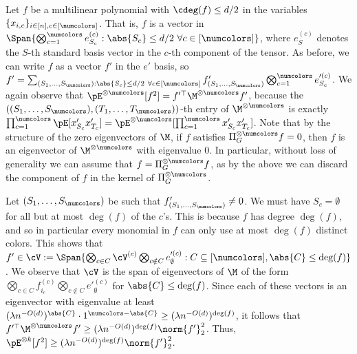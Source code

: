 Let $f$ be a multilinear polynomial with $\cdeg(f) \leq d/2$ in the variables $\{x_{i,c}\}_{i \in [n], c \in [\numcolors]}$. That is, $f$ is a vector in $\Span{ \bigotimes_{c =1}^{\numcolors} e^{(c)}_{S_c} : \abs{S_c} \leq d/2 \ \forall c \in [\numcolors]}$, where $e^{(c)}_S$ denotes the $S$-th standard basis vector in the $c$-th component of the tensor. As before, we can write $f$ as a vector $f'$ in the $e'$ basis, so $f' = \sum_{(S_1, \dots, S_\numcolors) : \abs{S_c} \leq d/2 \ \forall c \in [\numcolors]} f'_{(S_1, \dots, S_\numcolors)} \bigotimes_{c = 1}^\numcolors e'^{(c)}_{S_c}$. We again observe that $\pE^{\otimes \numcolors}[f^2] = f'^{\top} \M^{\otimes \numcolors} f'$, because the $((S_1, \dots, S_\numcolors),(T_1 ,\dots, T_\numcolors))$-th entry of $\M^{\otimes \numcolors}$ is exactly $\prod_{c = 1}^\numcolors \pE[x'_{S_c} x'_{T_c}] = \pE^{\otimes \numcolors}[\prod_{c = 1}^\numcolors x'_{S_c} x'_{T_c}]$.  Note that by the structure of the zero eigenvectors of $\M$, if $f$ satisfies $\Pi_G^{\otimes \numcolors} f = 0$, then $f$ is an eigenvector of $\M^{\otimes \numcolors}$ with eigenvalue $0$. In particular, without loss of generality we can assume that $f = \Pi_G^{\otimes \numcolors} f$, as by the above we can discard the component of $f$ in the kernel of $\Pi_G^{\otimes \numcolors}$.

Let $(S_1, \dots, S_\numcolors)$ be such that $f'_{(S_1, \dots, S_\numcolors)} \ne 0$. We must have $S_c = \emptyset$ for all but at most $\deg(f)$ of the $c$'s. This is because $f$ has degree $\deg(f)$, and so in particular every monomial in $f$ can only use at most $\deg(f)$ distinct colors. This shows that $f' \in \cV := \Span{ \bigotimes_{c \in C} \cV^{(c)} \bigotimes_{c \notin C} e'^{(c)}_{\emptyset} : C \subseteq [\numcolors], \abs{C} \leq \deg(f)}$. We observe that $\cV$ is the span of eigenvectors of $\M$ of the form $\bigotimes_{c \in C} f_{i_c}^{(c)} \bigotimes_{c \notin C} e'^{(c)}_{\emptyset}$ for $\abs{C} \leq \deg(f)$. Since each of these vectors is an eigenvector with eigenvalue at least $(\lambda n^{-O(d)})^{\abs{C}} \cdot 1^{\numcolors - \abs{C}} \geq (\lambda n^{-O(d)})^{\deg(f)}$, it follows that $f'^{\top} \M^{\otimes \numcolors} f' \geq (\lambda n^{-O(d)})^{\deg(f)}\norm{f'}_2^2$. Thus, $\pE^{\otimes k}[f^2] \geq (\lambda n^{-O(d)})^{\deg(f)}\norm{f'}_2^2$.

